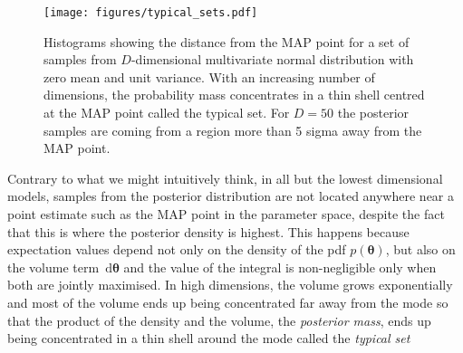 \documentclass[12pt,dvipsnames]{report}
\newcommand{\ud}{\,\mathrm{d}}
\renewcommand{\vec}[1]{\boldsymbol{\mathbf{#1}}}
\begin{document}
%
\begin{figure}[t]
    \begin{centering}
        \texttt{[image: figures/typical\_sets.pdf]}
        \caption{Histograms showing the distance from the MAP point for a set of 
        samples from $D$-dimensional multivariate normal distribution with 
        zero mean and unit variance. With an increasing number of dimensions, the 
        probability mass concentrates in a thin shell centred at the MAP point 
        called the typical set. For $D=50$ the posterior samples are coming from 
        a region more than 5 sigma away from the MAP point.}     
               \label{fig:typical_sets}
    \end{centering}
\end{figure}
Contrary to what we might intuitively think, in all but the lowest dimensional models,
samples from the posterior distribution are not located anywhere 
near a point estimate such as the MAP point in the parameter space, despite the fact 
that this is where the posterior density is highest.
This happens because expectation values  depend not only on the density of the pdf 
$p(\vec\theta)$, but also on the volume term 
$\ud \vec\theta$ and the value of the integral is non-negligible only when both are 
jointly maximised. In high dimensions, the volume grows exponentially and most 
of the volume ends up being concentrated far away from the mode so that 
the product of the density and the  volume, the \emph{posterior mass}, ends up 
being concentrated in a thin shell around the mode called the \emph{typical set} 
\end{document}
